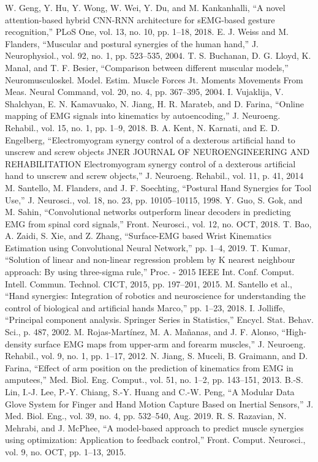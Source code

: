 \documentclass[conference]{IEEEtran}
\begin{document}
\begin{thebibliography}{00}
 W. Geng, Y. Hu, Y. Wong, W. Wei, Y. Du, and M. Kankanhalli, “A novel attention-based hybrid CNN-RNN architecture for sEMG-based gesture recognition,” PLoS One, vol. 13, no. 10, pp. 1–18, 2018.
 E. J. Weiss and M. Flanders, “Muscular and postural synergies of the human hand,” J. Neurophysiol., 
vol. 92, no. 1, pp. 523–535, 2004.
 T. S. Buchanan, D. G. Lloyd, K. Manal, and T. F. Besier, “Comparison between different muscular 
models,” Neuromusculoskel. Model. Estim. Muscle Forces Jt. Moments Movements From Meas. 
Neural Command, vol. 20, no. 4, pp. 367–395, 2004.
 I. Vujaklija, V. Shalchyan, E. N. Kamavuako, N. Jiang, H. R. Marateb, and D. Farina, “Online 
mapping of EMG signals into kinematics by autoencoding,” J. Neuroeng. Rehabil., vol. 15, no. 1, pp. 
1–9, 2018.
 B. A. Kent, N. Karnati, and E. D. Engelberg, “Electromyogram synergy control of a dexterous 
artificial hand to unscrew and screw objects JNER JOURNAL OF NEUROENGINEERING AND 
REHABILITATION Electromyogram synergy control of a dexterous artificial hand to unscrew and
screw objects,” J. Neuroeng. Rehabil., vol. 11, p. 41, 2014
 M. Santello, M. Flanders, and J. F. Soechting, “Postural Hand Synergies for Tool Use,” J. Neurosci., 
vol. 18, no. 23, pp. 10105–10115, 1998.
 Y. Guo, S. Gok, and M. Sahin, “Convolutional networks outperform linear decoders in predicting 
EMG from spinal cord signals,” Front. Neurosci., vol. 12, no. OCT, 2018.
 T. Bao, A. Zaidi, S. Xie, and Z. Zhang, “Surface-EMG based Wrist Kinematics Estimation using 
Convolutional Neural Network,” pp. 1–4, 2019.
 T. Kumar, “Solution of linear and non-linear regression problem by K nearest neighbour approach: 
By using three-sigma rule,” Proc. - 2015 IEEE Int. Conf. Comput. Intell. Commun. Technol. CICT,
2015, pp. 197–201, 2015.
 M. Santello et al., “Hand synergies: Integration of robotics and neuroscience for understanding the 
control of biological and artificial hands Marco,” pp. 1–23, 2018.
 I. Jolliffe, “Principal component analysis. Springer Series in Statistics,” Encycl. Stat. Behav. Sci., p. 
487, 2002.
 M. Rojas-Martínez, M. A. Mañanas, and J. F. Alonso, “High-density surface EMG maps from upper-arm and forearm muscles,” J. Neuroeng. Rehabil., vol. 9, no. 1, pp. 1–17, 2012.
 N. Jiang, S. Muceli, B. Graimann, and D. Farina, “Effect of arm position on the prediction of 
kinematics from EMG in amputees,” Med. Biol. Eng. Comput., vol. 51, no. 1–2, pp. 143–151, 2013.
 B.-S. Lin, I.-J. Lee, P.-Y. Chiang, S.-Y. Huang and C.-W. Peng, “A Modular Data Glove System for 
Finger and Hand Motion Capture Based on Inertial Sensors,” J. Med. Biol. Eng., vol. 39, no. 4, pp. 
532–540, Aug. 2019.
 R. S. Razavian, N. Mehrabi, and J. McPhee, “A model-based approach to predict muscle synergies 
using optimization: Application to feedback control,” Front. Comput. Neurosci., vol. 9, no. OCT, pp. 
1–13, 2015.
\end{thebibliography}
\end{document}
